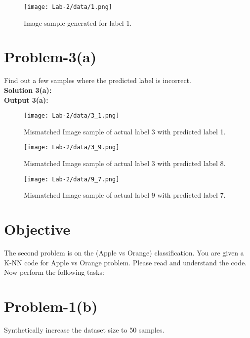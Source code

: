 \FloatBarrier

\begin{figure}[ht]
\centering
\texttt{[image: Lab-2/data/1.png]}
\caption{Image sample generated for label 1.}
\label{fig:sample}
\end{figure}

\FloatBarrier

\section{Problem-3(a)}
Find out a few samples where the predicted label is incorrect.\\

\textbf{Solution 3(a): }
\\

\textbf{Output 3(a): }

\begin{figure}[ht]
\centering
\texttt{[image: Lab-2/data/3\_1.png]}
\caption{Mismatched Image sample of actual label 3 with predicted label 1.}
\label{fig:sample}
\end{figure}

\FloatBarrier

\begin{figure}[ht]
\centering
\texttt{[image: Lab-2/data/3\_9.png]}
\caption{Mismatched Image sample of actual label 3 with predicted label 8.}
\label{fig:sample}
\end{figure}

\FloatBarrier

\begin{figure}[ht]
\centering
\texttt{[image: Lab-2/data/9\_7.png]}
\caption{Mismatched Image sample of actual label 9 with predicted label 7.}
\label{fig:sample}
\end{figure}

\FloatBarrier

\section{Objective}
The second problem is on the (Apple vs Orange) classification. You are given a K-NN code for Apple vs Orange problem. Please read and understand the code. Now perform the following tasks:

\section{Problem-1(b)}
Synthetically increase the dataset size to 50 samples.\\\\


